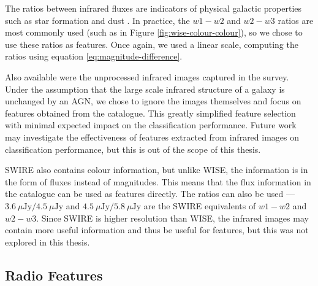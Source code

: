     The ratios between infrared fluxes are indicators of physical galactic
    properties such as star formation and dust . In practice, the $w1 - w2$ and $w2 - w3$
    ratios are most commonly used (such as in Figure
    \ref{fig:wise-colour-colour}), so we chose to use these ratios as features.
    Once again, we used a linear scale, computing the ratios using equation
    \ref{eq:magnitude-difference}.

    Also available were the unprocessed infrared images captured in the survey.
    Under the assumption that the large scale infrared structure of a galaxy is
    unchanged by an AGN, we chose to ignore the images themselves and focus on
    features obtained from the catalogue. This greatly simplified feature
    selection with minimal expected impact on the classification performance.
    Future work may investigate the effectiveness of features extracted from
    infrared images on classification performance, but this is out of the scope
    of this thesis.

    SWIRE also contains colour information, but unlike WISE, the information is
    in the form of fluxes instead of magnitudes. This means that the flux
    information in the catalogue can be used as features directly. The ratios
    can also be used --- $3.6\ \mu\text{Jy} / 4.5\ \mu\text{Jy}$ and $4.5\
    \mu\text{Jy} / 5.8\ \mu\text{Jy}$ are the SWIRE equivalents of $w1 - w2$ and
    $w2 - w3$. Since SWIRE is higher resolution than WISE, the
    infrared images may contain more useful information and thus be useful for
    features, but this was not explored in this thesis.



  \subsection{Radio Features}
  \label{sec:image-features}


